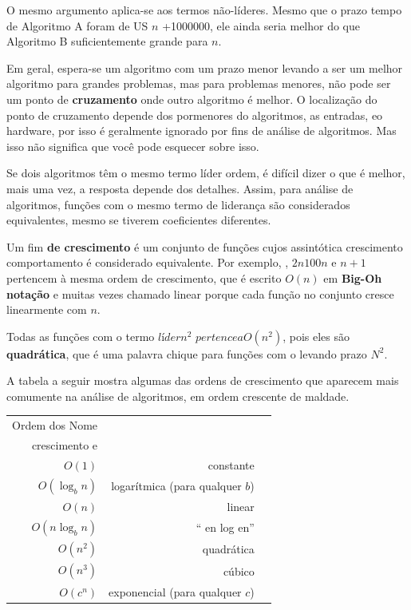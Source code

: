 \documentclass[10pt]{book}
\begin{document}
\begin{v erbatim}
O mesmo argumento aplica-se aos termos não-líderes. Mesmo que o prazo
tempo de Algoritmo A foram de US $ n $ +1000000, ele ainda seria melhor do que
Algoritmo B suficientemente grande para $ n $.

Em geral, espera-se um algoritmo com um prazo menor levando a ser um
melhor algoritmo para grandes problemas, mas para problemas menores, não
pode ser um ponto de {\bf cruzamento} onde outro algoritmo é melhor. O
localização do ponto de cruzamento depende dos pormenores do
algoritmos, as entradas, eo hardware, por isso é geralmente ignorado por
fins de análise de algoritmos. Mas isso não significa que você pode esquecer
sobre isso.

Se dois algoritmos têm o mesmo termo líder ordem, é difícil dizer
o que é melhor, mais uma vez, a resposta depende dos detalhes. Assim, para
análise de algoritmos, funções com o mesmo termo de liderança
são considerados equivalentes, mesmo se tiverem coeficientes diferentes.

Um fim {\bf de crescimento} é um conjunto de funções cujos assintótica crescimento
comportamento é considerado equivalente. Por exemplo, $ $, $ 2n 100n $ e $ n +1 $
pertencem à mesma ordem de crescimento, que é escrito $ O (n) $ em
{\bf Big-Oh notação} e muitas vezes chamado {linear \bf} porque cada função
no conjunto cresce linearmente com $ n $.

Todas as funções com o termo $ líder n ^ 2 $ $ pertence a O (n ^ 2) $, pois eles são
{\bf quadrática}, que é uma palavra chique para funções com o
levando prazo $ N ^ 2 $.

A tabela a seguir mostra algumas das ordens de crescimento que
aparecem mais comumente na análise de algoritmos,
em ordem crescente de maldade.

\begin{tabular} {| r | r | r |}
\hline
Ordem dos Nome & \\
crescimento e \\
\hline
$ O (1) $ & constante \\
$ O (\log_b n) $ & logarítmica (para qualquer $ b $) \\
$ O (n) $ & linear \\
$ O (n \log_b n) $ & `` en log en'' \\
$ O (n ^ 2) $ & quadrática \\
$ O (n ^ 3) $ & cúbico \\
$ O (c ^ n) $ & exponencial (para qualquer $ c $) \\
\hline
\end{tabular}


\end{v erbatim}
\end{document}
